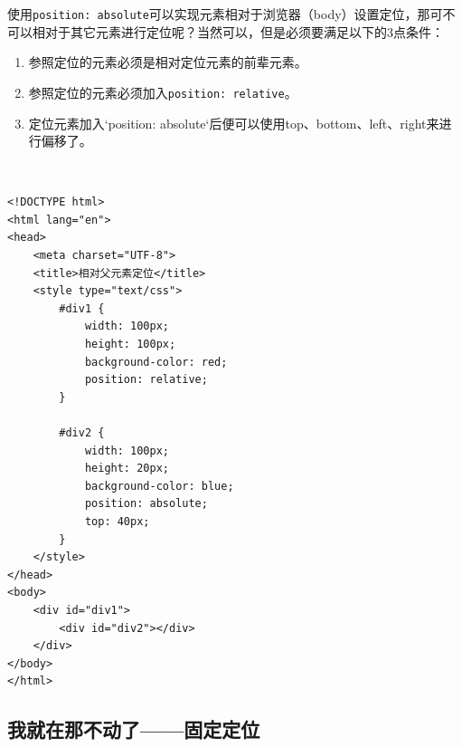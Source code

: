 \begin{figure}[H]
    \centering
\end{figure}

使用\lstinline|position: absolute|可以实现元素相对于浏览器（body）设置定位，那可不可以相对于其它元素进行定位呢？当然可以，但是必须要满足以下的3点条件：

\begin{enumerate}
    \item 参照定位的元素必须是相对定位元素的前辈元素。
    \item 参照定位的元素必须加入\lstinline|position: relative|。
    \item 定位元素加入`position: absolute`后便可以使用top、bottom、left、right来进行偏移了。
\end{enumerate}

 \\
\begin{lstlisting}[style=htmlcssjs]
<!DOCTYPE html>
<html lang="en">
<head>
    <meta charset="UTF-8">
    <title>相对父元素定位</title>
    <style type="text/css">
        #div1 {
            width: 100px;
            height: 100px;
            background-color: red;
            position: relative;
        }

        #div2 {
            width: 100px;
            height: 20px;
            background-color: blue;
            position: absolute;
            top: 40px;
        }
    </style>
</head>
<body>
    <div id="div1">
        <div id="div2"></div>
    </div>
</body>
</html>
\end{lstlisting}

\begin{figure}[H]
    \centering
\end{figure}

\subsection{我就在那不动了——固定定位}

